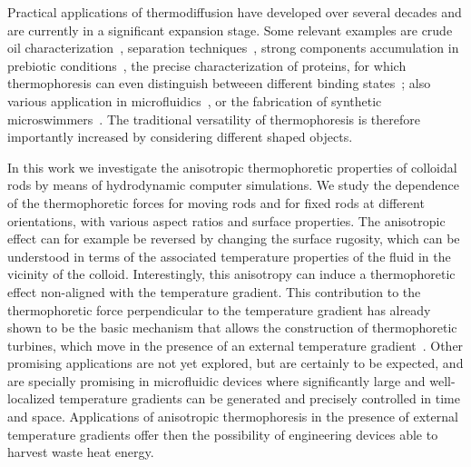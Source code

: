 \documentclass[aps,pre,twocolumn,showpacs,superscriptaddress]{revtex4-1}
\begin{document}
Practical applications of thermodiffusion have developed over several
decades and are currently in a significant expansion stage. Some
relevant examples are crude oil characterization~\cite{ghorayeb03},
separation techniques~\cite{gidd93}, strong components
accumulation in prebiotic conditions~\cite{braun07pnas,niether16}, the
precise characterization of proteins, for which thermophoresis can even
distinguish betweeen different binding states~\cite{jerabek14}; also 
various application in microfluidics~\cite{piazza10,16tratchet}, or the 
fabrication of synthetic microswimmers~\cite{jiang10,yang11dimer,yang14janus}. %
The traditional versatility of thermophoresis is therefore importantly
increased by considering different shaped objects.

In this work we investigate the anisotropic thermophoretic properties
of colloidal rods by means of hydrodynamic computer simulations. We
study the dependence of the thermophoretic forces for moving rods and
for fixed rods at different orientations, with various aspect
ratios and surface properties.  The anisotropic effect can for example
be reversed by changing the surface rugosity, which can be understood
in terms of the associated temperature properties of the fluid in the
vicinity of the colloid.  Interestingly, this anisotropy can induce a
thermophoretic effect non-aligned with the temperature gradient. This
contribution to the thermophoretic force perpendicular to the
temperature gradient has already shown to be the basic mechanism that
allows the construction of thermophoretic turbines, which move in the
presence of an external temperature gradient~\cite{yang14turb}. Other
promising applications are not yet explored, but are certainly to be
expected, and are specially promising in microfluidic devices where
significantly large and well-localized temperature gradients can
be generated and precisely controlled in time and space. Applications
of anisotropic thermophoresis in the presence of external temperature
gradients offer then the possibility of engineering devices able to
harvest waste heat energy.
\end{document}
